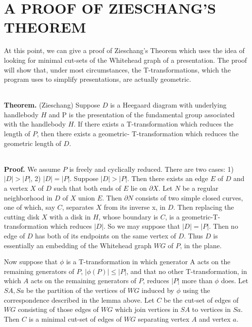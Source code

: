 \documentclass[12pt]{amsart}
\newcommand{\theorem}{\ \\ \noindent  \textbf{Theorem.} }
\newcommand{\pf}{\ \\ \noindent \textbf{Proof.} }
\begin{document}
                                                        \section{A PROOF OF ZIESCHANG'S THEOREM}
                                                        
                At this point, we can give a proof of Zieschang's Theorem which uses the idea of
        looking for minimal cut-sets of the Whitehead graph of a presentation. The proof will
        show that, under most circumstances, the T-transformations, which the program uses to
        simplify presentations, are actually geometric.
        
        \theorem (Zieschang) Suppose $D$ is a Heegaard diagram with underlying handlebody $H$ and P
        is the presentation of the fundamental group associated with the handlebody $H$. If there
        exists a T-transformation which reduces the length of $P$, then there exists a geometric-
        T-transformation which reduces the geometric length of $D$.
        
        \pf We assume $P$ is freely and cyclically reduced. There are two cases: 1) $|D| > |P|$,
        2) $|D| = |P|$.
                Suppose $|D| > |P|$. Then there exists an edge $E$ of $D$ and a vertex $X$ of $D$ such that
        both ends of $E$ lie on $\partial X$. Let $N$ be a regular neighborhood in $D$ of $X$ union $E$. Then $\partial N$
        consists of two simple closed curves, one of which, say $C$, separates $X$ from its inverse
        x, in $D$. Then replacing the cutting disk $X$ with a disk in $H$, whose boundary is $C$, is a
        geometric-T-transformation which reduces $|D|$.
                So we may suppose that $|D| = |P|$. Then no edge of $D$ has both of its endpoints on
        the same vertex of $D$. Thus $D$ is essentially an embedding of the Whitehead graph $WG$ of $P$,
        in the plane.

                Now suppose that $\phi$ is a T-transformation in which generator A acts on the remaining
        generators of $P$, $|\phi(P)| \leq |P|$, and that no other T-transformation, in which $A$ acts on
        the remaining generators of $P$, reduces $|P|$ more than $\phi$ does. Let $SA,Sa$ be the partition
        of the vertices of $WG$ induced by $\phi$ using the correspondence described in the lemma above.
        Let $C$ be the cut-set of edges of $WG$ consisting of those edges of $WG$ which join vertices in
        $SA$ to vertices in $Sa$. Then $C$ is a minimal cut-set of edges of $WG$ separating vertex $A$ and
        vertex $a$.
\end{document}
